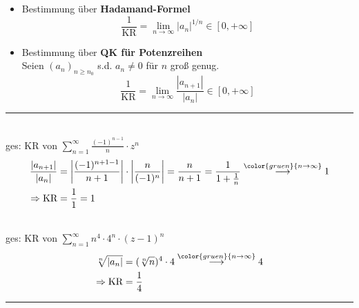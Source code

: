 \documentclass{article}
\newcommand{\commentmath}[1]{{\color{gruen}{#1}}}
\begin{document}
\begin{itemize}
	\item Bestimmung über \textbf{Hadamand-Formel}
		\begin{equation}
			\frac{1}{\text{KR}} = \lim\limits_{n\rightarrow\infty} |a_n|^{1/n} \in [0,+\infty]
		\end{equation}
	
	\item Bestimmung über \textbf{QK für Potenzreihen}\\
	Seien $(a_n)_{n\geq n_0}$ s.d. $a_n\neq 0$ für $n$ groß genug.
		\begin{equation}
			\frac{1}{\text{KR}} = \lim\limits_{n\rightarrow\infty} \frac{|a_{n+1}|}{|a_n|} \in [0,+\infty]
		\end{equation}			
\end{itemize}


\begin{minipage}{\textwidth}
{\color{blue}
\hrule
	\\
	ges: KR von $\sum_{n=1}^\infty \frac{(-1)^{n-1}}{n} \cdot z^n$
		\begin{align*}
			\frac{|a_{n+1}|}{|a_n|} &= \left| \frac{(-1)^{n+1-1}}{n+1} \right| \cdot \left| \frac{n}{(-1)^n} \right| = \frac{n}{n+1} = \frac{1}{1 + \frac{1}{n}} \stackrel{\commentmath{n\rightarrow\infty}}{\longrightarrow} 1\\
			 \Rightarrow \text{KR} &= \frac{1}{1} = 1
		\end{align*}


	\\
	ges: KR von $\sum_{n=1}^\infty n^4 \cdot 4^n \cdot (z-1)^n$
		\begin{align*}
			\sqrt[n]{|a_n|} &= (\sqrt[n]{n})^4 \cdot 4 \stackrel{\commentmath{n\rightarrow\infty}}{\longrightarrow} 4 \\
		\Rightarrow \text{KR} &= \frac{1}{4}
		\end{align*}
\hrule
}
\end{minipage}


\newpage
\end{document}
